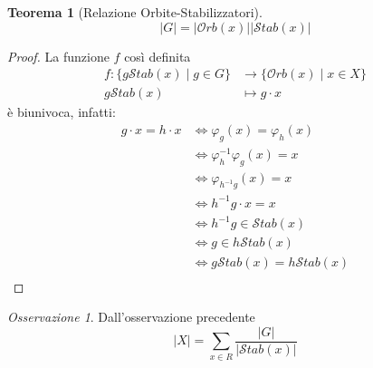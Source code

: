 \documentclass[a4paper]{article}
\newtheorem{theorem}{Teorema}[section]
\theoremstyle{remark}
\newtheorem*{remark}{Osservazione}
\theoremstyle{definition}
\newcommand{\Orb}[1]{\mathcal{O}rb\left( #1 \right)}
\newcommand{\Stab}[1]{\mathcal{S}tab\left( #1 \right)}
\begin{document}
\begin{multicols}{2}
\begin{theorem}[Relazione Orbite-Stabilizzatori]
	\[ |G| = |\Orb{x}||\Stab{x}| \]
\end{theorem}
\begin{proof}
	La funzione $ f $ così definita
	\begin{align*}
	f \colon \{ g \Stab{x} \mid g \in G \} &\to \{\Orb{x} \mid x \in X\} \\
	g\Stab{x} &\mapsto g \cdot x
	\end{align*}
	è biunivoca, infatti:
	\begin{align*}
		g \cdot x = h \cdot x & \Leftrightarrow \varphi_g(x) = \varphi_h(x) \\
		& \Leftrightarrow \varphi_h^{-1} \varphi_g (x) = x \\
		& \Leftrightarrow \varphi_{h^{-1}g} (x) = x \\
		& \Leftrightarrow h^{-1}g \cdot x = x \\
		& \Leftrightarrow h^{-1}g \in \Stab{x} \\
		& \Leftrightarrow g \in h\Stab{x} \\
		& \Leftrightarrow g\Stab{x} = h\Stab{x} \\
	\end{align*}
\end{proof}
\begin{remark}
	Dall'osservazione precedente \[ |X| = \sum_{x \in R} \frac{|G|}{|\Stab{x}|} \]
\end{remark}


\end{multicols}
\end{document}
